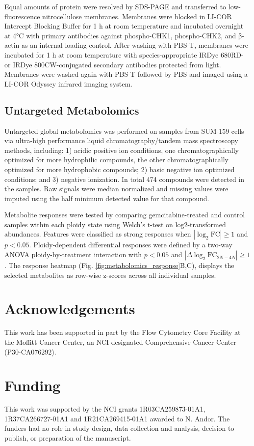 \documentclass[11pt,notitlepage]{article}
\begin{document}
Equal amounts of protein were resolved by SDS-PAGE and transferred to low-fluorescence nitrocellulose membranes. Membranes were blocked in LI-COR Intercept Blocking Buffer for 1 h at room temperature and incubated overnight at 4°C with primary antibodies against phospho-CHK1, phospho-CHK2, and β-actin as an internal loading control. After washing with PBS-T, membranes were incubated for 1 h at room temperature with species-appropriate IRDye 680RD- or IRDye 800CW-conjugated secondary antibodies protected from light. Membranes were washed again with PBS-T followed by PBS and imaged using a LI-COR Odyssey infrared imaging system.

\subsection{Untargeted Metabolomics} \label{sec:methods-metabolomics}
Untargeted global metabolomics was performed on samples from SUM-159 cells via ultra-high performance liquid chromatography/tandem mass spectroscopy methods, including: 1) acidic positive ion conditions, one chromatographically optimized for more hydrophilic compounds, the other chromatographically optimized for more hydrophobic compounds; 2) basic negative ion optimized conditions; and 3) negative ionization. In total 474 compounds were detected in the samples. Raw signals were median normalized and missing values were imputed using the half minimum detected value for that compound.

Metabolite responses were tested by comparing gemcitabine-treated and control samples within each ploidy state using Welch's t-test on log2-transformed abundances. Features were
  classified as strong responses when \(|\log_2\mathrm{FC}| \geq 1\) and \(p < 0.05\). Ploidy-dependent differential responses were defined by a two-way ANOVA ploidy-by-treatment
  interaction with \(p < 0.05\) and \(|\Delta\log_2\mathrm{FC}_{2N-4N}| \geq 1\). The response heatmap (Fig. \ref{fig:metabolomics_response}B,C), displays the selected metabolites as row-wise z-scores across all individual samples.

\section*{Acknowledgements}
This work has been supported in part by the Flow Cytometry Core Facility at the Moffitt Cancer Center, an NCI designated Comprehensive Cancer Center (P30-CA076292).

\section*{Funding}
This work was supported by the NCI grants 1R03CA259873-01A1, 1R37CA266727-01A1 and 1R21CA269415-01A1 awarded to N. Andor. The funders had no role in study design, data collection and analysis, decision to publish, or preparation of the manuscript.
\end{document}
